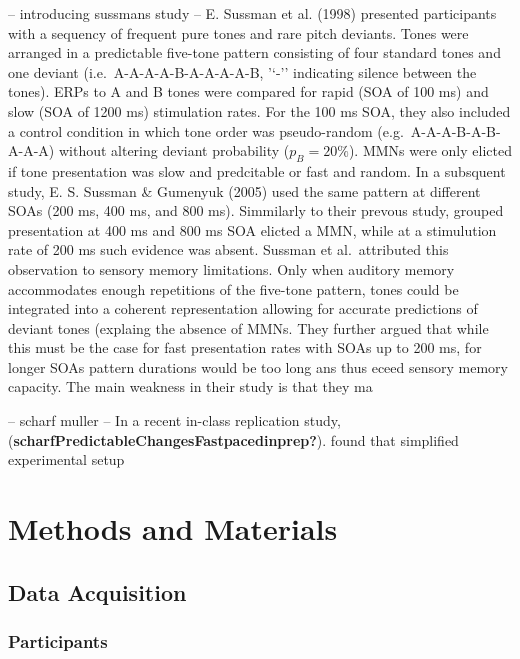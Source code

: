 \documentclass[stu,a4paper,12pt, nofontenc, babel, american]{apa7}
\begin{document}
-- introducing sussmans study -- E. Sussman et al. (1998) presented
participants with a sequency of frequent pure tones and rare pitch
deviants. Tones were arranged in a predictable five-tone pattern
consisting of four standard tones and one deviant
(i.e.~A-A-A-A-B-A-A-A-A-B, '\enquote*{-}' indicating silence between the
tones). ERPs to A and B tones were compared for rapid (SOA of 100 ms)
and slow (SOA of 1200 ms) stimulation rates. For the 100 ms SOA, they
also included a control condition in which tone order was pseudo-random
(e.g.~A-A-A-B-A-B-A-A-A) without altering deviant probability
(\(p_B = 20\%\)). MMNs were only elicted if tone presentation was slow
and predcitable or fast and random. In a subsquent study, E. S. Sussman
\& Gumenyuk (2005) used the same pattern at different SOAs (200 ms, 400
ms, and 800 ms). Simmilarly to their prevous study, grouped presentation
at 400 ms and 800 ms SOA elicted a MMN, while at a stimulution rate of
200 ms such evidence was absent. Sussman et al.~attributed this
observation to sensory memory limitations. Only when auditory memory
accommodates enough repetitions of the five-tone pattern, tones could be
integrated into a coherent representation allowing for accurate
predictions of deviant tones (explaing the absence of MMNs. They further
argued that while this must be the case for fast presentation rates with
SOAs up to 200 ms, for longer SOAs pattern durations would be too long
ans thus eceed sensory memory capacity. The main weakness in their study
is that they ma

-- scharf muller -- In a recent in-class replication study,
(\textbf{scharfPredictableChangesFastpacedinprep?}). found that
simplified experimental setup

\newpage

\hypertarget{methods-and-materials}{%
\section{Methods and Materials}\label{methods-and-materials}}

\hypertarget{data-acquisition}{%
\subsection{Data Acquisition}\label{data-acquisition}}

\hypertarget{participants}{%
\subsubsection{Participants}\label{participants}}
\end{document}
